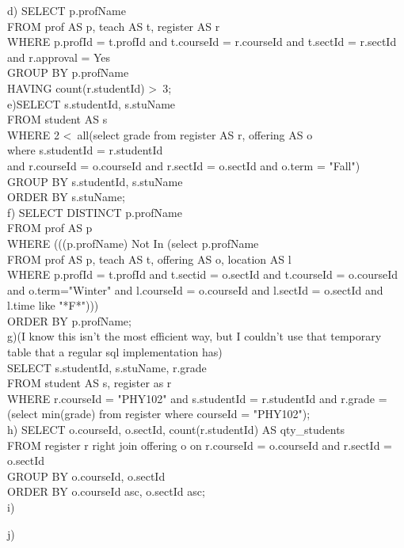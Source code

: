 \documentclass{article}
\begin{document}
d)
SELECT p.profName \\
FROM prof AS p, teach AS t, register AS r \\
WHERE p.profId = t.profId and t.courseId = r.courseId and t.sectId = r.sectId and r.approval = Yes \\
GROUP BY p.profName \\
HAVING count(r.studentId) \textgreater \ 3; \\

e)SELECT s.studentId, s.stuName \\
FROM student AS s \\
WHERE 2 \textless \ all(select grade from register AS r, offering AS o \\
where s.studentId = r.studentId \\
and r.courseId = o.courseId and r.sectId = o.sectId and o.term = "Fall") \\
GROUP BY s.studentId, s.stuName \\
ORDER BY s.stuName; \\

f)
SELECT DISTINCT p.profName \\
FROM prof AS p \\
WHERE (((p.profName) Not In (select p.profName \\
FROM prof AS p, teach AS t, offering AS o, location AS l \\
WHERE p.profId = t.profId and t.sectid = o.sectId and t.courseId = o.courseId and o.term="Winter" and l.courseId = o.courseId and l.sectId = o.sectId and l.time like "*F*"))) \\
ORDER BY p.profName; \\

g)(I know this isn't the most efficient way, but I couldn't use that temporary table that a regular sql implementation has)\\
SELECT s.studentId, s.stuName, r.grade\\
FROM student AS s, register as r \\
WHERE r.courseId = "PHY102" and s.studentId = r.studentId and r.grade =(select min(grade) from register  where courseId = "PHY102");\\

h)
SELECT  o.courseId, o.sectId, count(r.studentId) AS qty\_students \\
FROM register r right join offering o on r.courseId = o.courseId and r.sectId = o.sectId \\
GROUP BY o.courseId, o.sectId \\
ORDER BY o.courseId asc, o.sectId asc; \\

i)

j)
\end{document}
